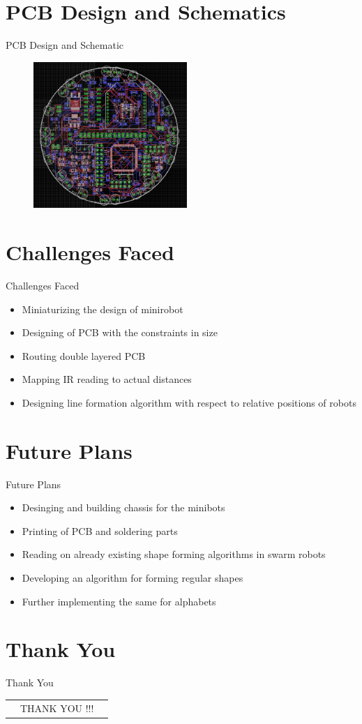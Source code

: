 \documentclass[10pt, a4paper]{beamer}
\begin{document}
\section{PCB Design and Schematics}
\begin{frame}{PCB Design and Schematic}
\begin{figure}
	\includegraphics[width=220px]{PCB_design_layout.png}
	\label{fig:PCB Design}
\end{figure}
\end{frame}


\section{Challenges Faced}
\begin{frame}{Challenges Faced}
	\begin{itemize}
		\item Miniaturizing the design of minirobot
		\item Designing of PCB with the constraints in size
		\item Routing double layered PCB
		\item Mapping IR reading to actual distances
		\item Designing line formation algorithm with respect to relative positions of robots
	\end{itemize}
\end{frame}

\section{Future Plans}
\begin{frame}{Future Plans}
	\begin{itemize}
		\item Desinging and building chassis for the minibots
		\item Printing of PCB and soldering parts
		\item Reading on already existing shape forming algorithms in swarm robots
		\item Developing an algorithm for forming regular shapes
		\item Further implementing the same for alphabets
	\end{itemize}
\end{frame}


\section{Thank You}
\begin{frame}{Thank You}
	\begin{tabular}{p{3cm} c c}
	 	& THANK YOU !!! &
	\end{tabular}
\end{frame}
\end{document}
